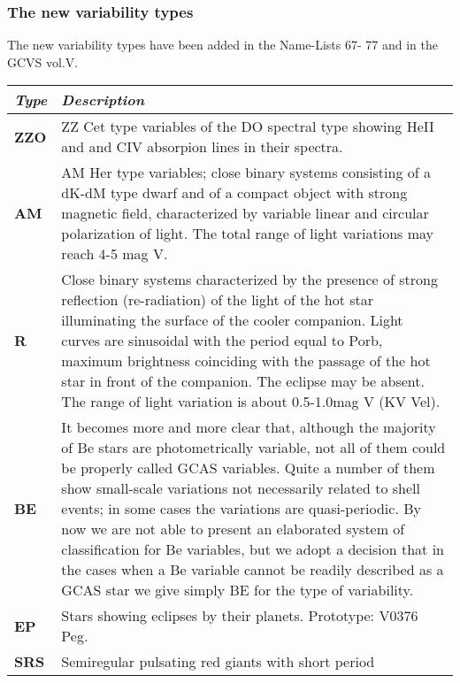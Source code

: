 \subsubsection{The new variability types}\label{the-new-variability-types}

The new variability types have been added in the Name-Lists 67- 77 and
in the GCVS vol.V.

\begin{longtabu} to \textwidth {l|X}\toprule
\emph{Type}    & \emph{Description}\\\midrule
\textbf{ZZO}   & ZZ Cet type variables of the DO spectral type showing
                 HeII and and CIV absorpion lines in their spectra.\\
\textbf{AM}    & AM Her type variables; close binary systems consisting of
                 a dK-dM type dwarf and of a compact object with strong magnetic field,
                 characterized by variable linear and circular polarization of light. The
                 total range of light variations may reach 4-5 mag V.\\
\textbf{R}     & Close binary systems characterized by the presence of
                 strong reflection (re-radiation) of the light of the hot star
                 illuminating the surface of the cooler companion. Light curves are
                 sinusoidal with the period equal to Porb, maximum brightness coinciding
                 with the passage of the hot star in front of the companion. The eclipse
                 may be absent. The range of light variation is about 0.5-1.0mag V (KV Vel).\\\midrule
\textbf{BE}    & It becomes more and more clear that, although the majority
                 of Be stars are photometrically variable, not all of them could be
                 properly called GCAS variables. Quite a number of them show small-scale
                 variations not necessarily related to shell events; in some cases the
                 variations are quasi-periodic. By now we are not able to present an
                 elaborated system of classification for Be variables, but we adopt a
                 decision that in the cases when a Be variable cannot be readily
                 described as a GCAS star we give simply BE for the type of variability.\\\midrule
\textbf{EP}    & Stars showing eclipses by their planets. Prototype: V0376 Peg.\\\midrule
\textbf{SRS}   & Semiregular pulsating red giants with short period

\end{longtabu}
